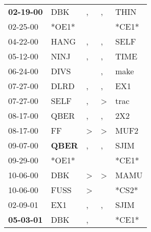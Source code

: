 \begin{supertabular}{p{0.07\textwidth}p{0.06\textwidth}p{0.02\textwidth}p{0.02\textwidth}p{0.06\textwidth}}
 \textbf{02-19-00\textsuperscript{}} &            DBK\textsuperscript{} &                , &             , &           THIN\textsuperscript{} \\
          02-25-00\textsuperscript{} &                            *OE1* &                  &               &                            *CE1* \\
          04-22-00\textsuperscript{} &           HANG\textsuperscript{} &                , &             , &           SELF\textsuperscript{} \\
          05-12-00\textsuperscript{} &           NINJ\textsuperscript{} &                , &             , &           TIME\textsuperscript{} \\
          06-24-00\textsuperscript{} &           DIVS\textsuperscript{} &                  &             , &           make\textsuperscript{} \\
          07-27-00\textsuperscript{} &           DLRD\textsuperscript{} &                , &             , &            EX1\textsuperscript{} \\
          07-27-00\textsuperscript{} &           SELF\textsuperscript{} &                , &  \textgreater &           trac\textsuperscript{} \\
          08-17-00\textsuperscript{} &           QBER\textsuperscript{} &                , &             , &            2X2\textsuperscript{} \\
          08-17-00\textsuperscript{} &             FF\textsuperscript{} &     \textgreater &  \textgreater &           MUF2\textsuperscript{} \\
          09-07-00\textsuperscript{} &  \textbf{QBER\textsuperscript{}} &                , &             , &           SJIM\textsuperscript{} \\
          09-29-00\textsuperscript{} &                            *OE1* &                  &               &                            *CE1* \\
          10-06-00\textsuperscript{} &            DBK\textsuperscript{} &     \textgreater &  \textgreater &           MAMU\textsuperscript{} \\
          10-06-00\textsuperscript{} &           FUSS\textsuperscript{} &     \textgreater &               &                            *CS2* \\
          02-09-01\textsuperscript{} &            EX1\textsuperscript{} &                , &             , &           SJIM\textsuperscript{} \\
 \textbf{05-03-01\textsuperscript{}} &            DBK\textsuperscript{} &                , &               &                            *CE1* \\

\end{supertabular}
